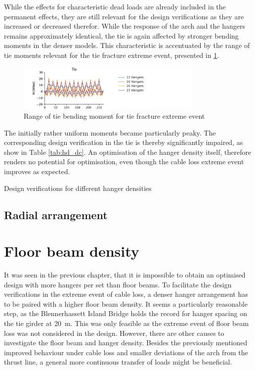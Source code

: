 While the effects for characteristic dead loads are already included in the permanent effects, they are still relevant for the design verifications as they are increased or decreased therefor. While the response of the arch and the hangers remains approximately identical, the tie is again affected by stronger bending moments in the denser models. This characteristic is accentuated by the range of tie moments relevant for the tie fracture extreme event, presented in \cref{fig:hd_tie_fracture}.

\begin{figure}[H]
    \centering
    \includegraphics[trim={0 0 3cm 0},clip, width=0.8\textwidth]{calculations/hanger amount comparison/tie fracture.png}
    \caption{Range of tie bending moment for tie fracture extreme event}
    \label{fig:hd_tie_fracture}
\end{figure}

The initially rather uniform moments became particularly peaky. The corresponding design verification in the tie is thereby significantly impaired, as show in Table \ref{tab:hd_dc}. An optimisation of the hanger density itself, therefore renders no potential for optimisation, even though the cable loss extreme event improves as expected.

\begin{table}[H]
    \centering
    \caption{Design verifications for different hanger densities}
    \label{tab:hd_dc}
    \resizebox{0.85\columnwidth}{!}{%
    
    }
\end{table}


\subsection{Radial arrangement} \label{sec:density_radial}


\section{Floor beam density} \label{sec:floor_beam_density}
It was seen in the previous chapter, that it is impossible to obtain an optimised design with more hangers per set than floor beams. To facilitate the design verifications in the extreme event of cable loss, a denser hanger arrangement has to be paired with a higher floor beam density. It seems a particularly reasonable step, as the Blennerhassett Island Bridge holds the record for hanger spacing on the tie girder at \SI{20}{m}. This was only feasible as the extreme event of floor beam loss was not considered in the design. However, there are other causes to investigate the floor beam and hanger density. Besides the previously mentioned improved behaviour under cable loss and smaller deviations of the arch from the thrust line, a general more continuous transfer of loads might be beneficial. \medskip

